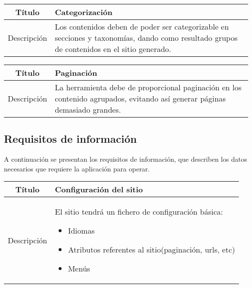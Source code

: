 \begin{center}

    \begin{tabularx}{\textwidth}{|c|X|}
        \hline
        Título & Categorización\\

        \hline

        Descripción & Los contenidos deben de poder ser categorizable en secciones y taxonomías,
        dando como resultado grupos de contenidos en el sitio generado.\\

        \hline
    \end{tabularx}
\end{center}

\begin{center}

    \begin{tabularx}{\textwidth}{|c|X|}
        \hline
        Título & Paginación\\

        \hline

        Descripción & La herramienta debe de proporcional paginación en los contenido agrupados, 
        evitando así generar páginas demasiado grandes.\\

        \hline
    \end{tabularx}
\end{center}

\subsection{Requisitos de información}

A continuación se presentan los requisitos de información, que describen los datos
necesarios que requiere la aplicación para operar.

\begin{center}

    \begin{tabularx}{\textwidth}{|c|X|}
        \hline
        Título & Configuración del sitio\\

        \hline

        Descripción & El sitio tendrá un fichero de configuración básica: 
        \begin{itemize}
            \item Idiomas
            \item Atributos referentes al sitio(paginación, urls, etc)
            \item Menús
        \end{itemize}\\

        \hline
    \end{tabularx}
\end{center}

